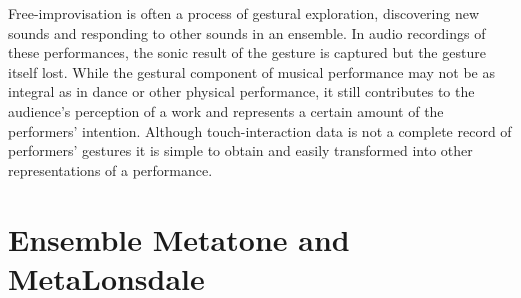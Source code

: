 \documentclass[graybox]{svmult}
\begin{document}
Free-improvisation is often a process of gestural exploration,
discovering new sounds and responding to other sounds in an ensemble.
In audio recordings of these performances, the sonic result of the
gesture is captured but the gesture itself lost. While the gestural
component of musical performance may not be as integral as in dance or
other physical performance, it still contributes to the audience's
perception of a work and represents a certain amount of the
performers' intention. Although touch-interaction data is not a
complete record of performers' gestures it is simple to obtain and
easily transformed into other representations of a performance.








\section{Ensemble Metatone and MetaLonsdale}
\end{document}
